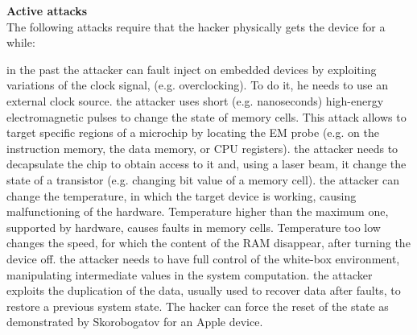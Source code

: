 \textbf{Active attacks}\\
The following attacks require that the hacker physically gets the device for a while:
\begin{itemize}
{in the past the attacker can fault inject on embedded devices by exploiting variations of the clock signal, (e.g. overclocking). To do it, he needs to use an external clock source.}
{the attacker uses short (e.g. nanoseconds) high-energy electromagnetic pulses to change the state of memory cells. This attack allows to target specific regions of a microchip by locating the EM probe (e.g. on the instruction memory, the data memory, or CPU registers).}
{the attacker needs to decapsulate the chip to obtain access to it and, using a laser beam, it change the state of a transistor (e.g. changing bit value of a memory cell).}
{the attacker can change the temperature, in which the target device is working, causing malfunctioning of the hardware. Temperature higher than the maximum one, supported by hardware, causes faults in memory cells. Temperature too low changes the speed, for which the content of the RAM disappear, after turning the device off.}
{the attacker needs to have full control of the white-box environment, manipulating intermediate values in the system computation.}
{the attacker exploits the duplication of the data, usually used to recover data after faults, to restore a previous system state. The hacker can force the reset of the state as demonstrated by Skorobogatov for an Apple device\cite{side_apple}.}
\end{itemize}

